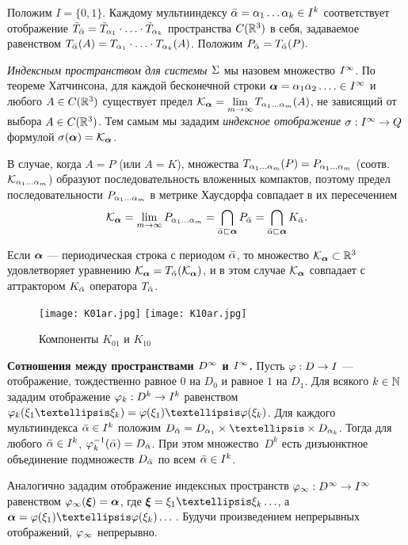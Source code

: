 Положим $I=\{0,1\}$. 
Каждому мультииндексу ${\bar{\alpha}}=\alpha_1\ldots\alpha_k\in I^k$  соответствует отображение $\tilde T_{\bar{\alpha}}={\tilde T}_{\alpha_1}\cdot\ldots\cdot{\tilde T}_{\alpha_k}$ пространства $C(\mathbb{R}^3)$ в себя, задаваемое равенством $ T_{\bar{\alpha}}(A)=T_{\alpha_1}\cdot\ldots\cdot T_{\alpha_k}(A)$. 
Положим $P_{\bar{\alpha}}=T_{\bar{\alpha}}(P).$

{\em Индексным пространством для системы $\Sigma$} мы назовем множество $I^\infty$. 
По теореме Хатчинсона, для каждой бесконечной строки ${\bm{\alpha}}=\alpha_1\alpha_2\ldots.\in I^\infty$  и любого $A\in C(\mathbb{R}^3)$ существует предел ${\mathcal K}_{\bm{\alpha}}=\lim\limits_{m\to\infty}T_{\alpha_1\ldots\alpha_m}(A)$, не зависящий от выбора   $A\in C(\mathbb{R}^3)$. 
Тем самым  мы зададим {\em индексное отображение} $\sigma:I^\infty\to Q$ формулой $\sigma({\bm{\alpha}})={\mathcal K}_{\bm{\alpha}}$.

В случае, когда $A=P$ (или $A=K$), множества $T_{\alpha_1\ldots\alpha_m}(P)=P_{\alpha_1\ldots\alpha_m}$ (соотв. ${\mathcal K}_{\alpha_1\ldots\alpha_m}$) образуют последовательность вложенных компактов, поэтому предел последовательности $P_{\alpha_1\ldots\alpha_m}$ в метрике Хаусдорфа совпадает в их пересечением
\begin{equation}\label{sigma} 
{\mathcal K}_{\bm{\alpha}}=\lim\limits_{m\to\infty}P_{\alpha_1\ldots\alpha_m}=\bigcap\limits_{{\bar{\alpha}}\sqsubset {\bm{\alpha}}}P_{\bar{\alpha}}=\bigcap\limits_{{\bar{\alpha}}\sqsubset {\bm{\alpha}}}K_{\bar{\alpha}}.
\end{equation}

Если ${\bm{\alpha}}$ --- периодическая строка с периодом $\bar{\alpha}$, то множество ${\mathcal K}_{\bm{\alpha}}\subset \mathbb{R}^3$ удовлетворяет уравнению ${\mathcal K}_{\bm{\alpha}}=T_{\bar{\alpha}}({\mathcal K}_{\bm{\alpha}})$, и  в этом случае ${\mathcal K}_{\bm{\alpha}}$ совпадает с аттрактором  $K_{\bar{\alpha}}$ оператора  $T_{\bar{\alpha}}$.


\begin{figure}[H]
\centering
\qquad
\texttt{[image: K01ar.jpg]}
\hfill
\texttt{[image: K10ar.jpg]}
\qquad
\caption{Компоненты $K_{01}$ и $K_{10}$}
\label{fig:5_4}
\end{figure}


{\bf Сотношения между пространствами $D^\infty$ и $I^\infty$.} Пусть $\varphi:D\to I$  ---  отображение, тождественно равное $0$ на   $D_0$ и равное $1$ на $D_1$. 
Для всякого $k\in\mathbb{N}$ зададим отображение $\varphi_k:D^k\to I^k$ равенством $\fy_k(\xi_1…\xi_k)=\fy(\xi_1)…\fy(\xi_k)$.
Для каждого мультииндекса  ${\bar{\alpha}}\in I^k$ положим $D_\bal=D_{\al_1}\times…\times D_{\al_k}$. 
Тогда для любого ${\bar{\alpha}}\in I^k$, $ \varphi_k^{-1}({\bar{\alpha}})=D_{\bar{\alpha}}$.
При этом множество~$D^k$ есть дизъюнктное объединение подмножеств $D_{\bar{\alpha}}$ по всем ${\bar{\alpha}}\in I^k$.

Аналогично зададим отображение индексных пространств $\varphi_\infty: D^\infty\to I^\infty$ равенством $\varphi_\infty({\bm{\xi}})={\bm{\alpha}}$, где  $\bmx=\xi_1…\xi_k\ldots$, а  $\bma=\fy(\xi_1)…\fy(\xi_k)\ldots$\,. 
Будучи произведением непрерывных отображений, $\varphi_\infty$ непрерывно.


